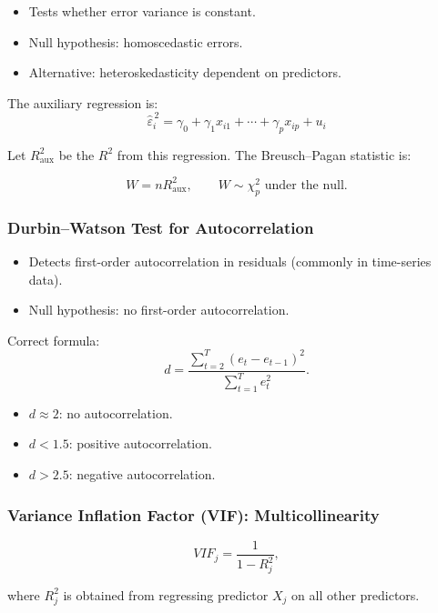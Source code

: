 \documentclass[10pt,a4paper]{article}
\begin{document}
	\begin{itemize}
		\item Tests whether error variance is constant.
		\item Null hypothesis: homoscedastic errors.
		\item Alternative: heteroskedasticity dependent on predictors.
	\end{itemize}

	The auxiliary regression is:
	 		\[
		\hat{\varepsilon}_i^{\,2} = \gamma_0 + \gamma_1 x_{i1} + \cdots + \gamma_p x_{ip} + u_i
		\]


	Let $R_{\text{aux}}^{2}$ be the $R^2$ from this regression.
	The Breusch--Pagan statistic is:

	 		\[
		W = n R_{\text{aux}}^{2},
		\qquad W \sim \chi^2_{p} \text{ under the null}.
		\]


	\subsubsection{Durbin--Watson Test for Autocorrelation}

	\begin{itemize}
		\item Detects first-order autocorrelation in residuals (commonly in time-series data).
		\item Null hypothesis: no first-order autocorrelation.
	\end{itemize}

	Correct formula:
	 		\[
		d = \frac{\sum_{t=2}^{T} (e_t - e_{t-1})^{2}}{\sum_{t=1}^{T} e_t^{2}}.
		\]


	\begin{itemize}
		\item $d \approx 2$: no autocorrelation.
		\item $d < 1.5$: positive autocorrelation.
		\item $d > 2.5$: negative autocorrelation.
	\end{itemize}

	\subsubsection{Variance Inflation Factor (VIF): Multicollinearity}

	 		\[
		VIF_j = \frac{1}{1 - R_j^{2}},
		\]


	where $R_j^{2}$ is obtained from regressing predictor $X_j$ on all other predictors.
\end{document}
